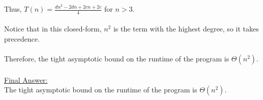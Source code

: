 \documentclass[12pt]{article}
\begin{document}
Thus, $T(n) = \frac{dn^2 - 2dn + 2cn + 2c}{4}$ for $n > 3$. \\
\\
Notice that in this closed-form, $n^2$ is the term with the highest degree, so it takes precedence. \\
\\
Therefore, the tight asymptotic bound on the runtime of the program is $\Theta (n^2)$. \\
\\
\underline{Final Answer:} \\
The tight asymptotic bound on the runtime of the program is $\Theta (n^2)$. \\
\end{document}
